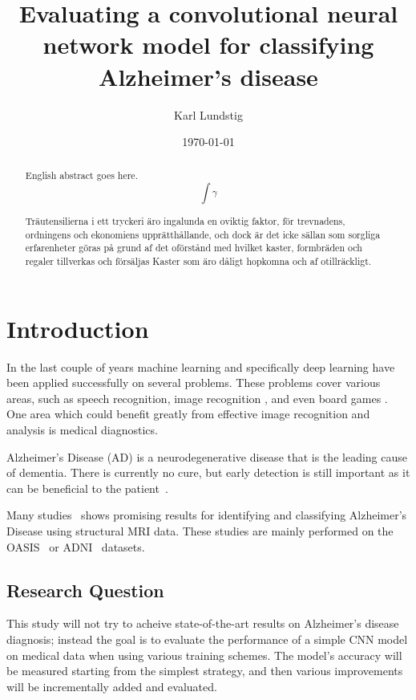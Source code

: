\documentclass{kththesis}
\title{Evaluating a convolutional neural network model for classifying Alzheimer's disease}
\author{Karl Lundstig}
\date{\today}
\begin{document}
\frontmatter

\titlepage

\begin{abstract}
  English abstract goes here.
  $$\int \gamma$$

\end{abstract}


\begin{otherlanguage}{swedish}
  \begin{abstract}
    Träutensilierna i ett tryckeri äro ingalunda en oviktig faktor,
    för trevnadens, ordningens och ekonomiens upprätthållande, och
    dock är det icke sällan som sorgliga erfarenheter göras på grund
    af det oförstånd med hvilket kaster, formbräden och regaler
    tillverkas och försäljas Kaster som äro dåligt hopkomna och af
    otillräckligt.
  \end{abstract}
\end{otherlanguage}


\setcounter{secnumdepth}{2}
\setcounter{tocdepth}{2}
\tableofcontents


\mainmatter

\chapter{Introduction}

In the last couple of years machine learning and specifically deep learning have been applied successfully on several problems. These problems cover various areas, such as speech recognition, image recognition \parencite{krizhevsky2012imagenet}, and even board games \parencite{silver2018general}. One area which could benefit greatly from effective image recognition and analysis is medical diagnostics.

Alzheimer’s Disease (AD) is a neurodegenerative disease that is the leading cause of dementia. There is currently no cure, but early detection is still important as it can be beneficial to the patient~\cite{factsfigures2018}.

Many studies~\cite{islam2017novel, islam2018early} shows promising results for identifying and classifying Alzheimer’s Disease using structural MRI data. These studies are mainly performed on the OASIS~\cite{oasis} or ADNI~\cite{adni} datasets.

\section{Research Question}
This study will not try to acheive state-of-the-art results on Alzheimer's disease diagnosis; instead the goal is to evaluate the performance of a simple CNN model on medical data when using various training schemes. The model's accuracy will be measured starting from the simplest strategy, and then various improvements will be incrementally added and evaluated.
\end{document}
